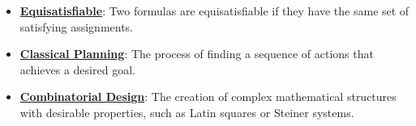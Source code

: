\documentclass{article}%
\begin{document}
\begin{itemize}[leftmargin=*]
\item \href{https://purdue.brightspace.com/d2l/common/assets/pdfjs-d2l-dist/1.0.14-legacy/web/viewer.html?file=%2Fcontent%2Fenforced%2F1095467-wl.202510.CS.24300.001%2F13L1-Logic.pdf%3Fou%3D1095467&lang=en-us&container=d2l-fileviewer-rendered-pdf&fullscreen=d2l-fileviewer-rendered-pdf-dialog&height=667#page=24}{\textbf{Equisatisfiable}}: Two formulas are equisatisfiable if they have the same set of satisfying assignments.%
\item \href{https://purdue.brightspace.com/d2l/common/assets/pdfjs-d2l-dist/1.0.14-legacy/web/viewer.html?file=%2Fcontent%2Fenforced%2F1095467-wl.202510.CS.24300.001%2F13L1-Logic.pdf%3Fou%3D1095467&lang=en-us&container=d2l-fileviewer-rendered-pdf&fullscreen=d2l-fileviewer-rendered-pdf-dialog&height=667#page=21}{\textbf{Classical Planning}}: The process of finding a sequence of actions that achieves a desired goal.%
\item \href{https://purdue.brightspace.com/d2l/common/assets/pdfjs-d2l-dist/1.0.14-legacy/web/viewer.html?file=%2Fcontent%2Fenforced%2F1095467-wl.202510.CS.24300.001%2F13L1-Logic.pdf%3Fou%3D1095467&lang=en-us&container=d2l-fileviewer-rendered-pdf&fullscreen=d2l-fileviewer-rendered-pdf-dialog&height=667#page=22}{\textbf{Combinatorial Design}}: The creation of complex mathematical structures with desirable properties, such as Latin squares or Steiner systems.%
\end{itemize}%
\end{document}

